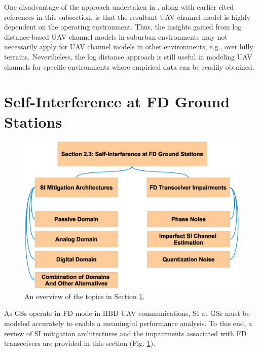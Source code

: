One disadvantage of the approach undertaken in \cite{sallouha2017aerial}, along with earlier cited references in this subsection, is that the resultant UAV channel model is highly dependent on the operating environment. Thus, the insights gained from log distance-based UAV channel models in suburban environments may not necessarily apply for UAV channel models in other environments, e.g., over hilly terrains. Nevertheless, the log distance approach is still useful in modeling UAV channels for specific environments where empirical data can be readily obtained.

\section{Self-Interference at FD Ground Stations} \label{lit_review_sec_si_fd_gs}

\begin{figure} [tpb]
\centering
\includegraphics [width=0.8\columnwidth]{chap2_fig/sec_3_taxonomy.eps} 
\vspace{-0.5cm}
\caption{An overview of the topics in Section \ref{lit_review_sec_si_fd_gs}.}
\label{fig:lit_review_sec_3_taxonomy}
\end{figure}

As GSs operate in FD mode in HBD UAV communications, SI at GSs must be modeled accurately to enable a meaningful performance analysis. To this end, a review of SI mitigation architectures and the impairments associated with FD transceivers are provided in this section (Fig. \ref{fig:lit_review_sec_3_taxonomy}).

